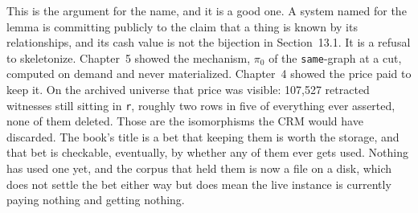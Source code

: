 This is the argument for the name, and it is a good one. A system named for the lemma is committing publicly to the claim that a thing is known by its relationships, and its cash value is not the bijection in Section~13.1. It is a refusal to skeletonize. Chapter~5 showed the mechanism, $\pi_0$ of the \texttt{same}-graph at a cut, computed on demand and never materialized. Chapter~4 showed the price paid to keep it. On the archived universe that price was visible: 107,527 retracted witnesses still sitting in \texttt{r}, roughly two rows in five of everything ever asserted, none of them deleted. Those are the isomorphisms the CRM would have discarded. The book's title is a bet that keeping them is worth the storage, and that bet is checkable, eventually, by whether any of them ever gets used. Nothing has used one yet, and the corpus that held them is now a file on a disk, which does not settle the bet either way but does mean the live instance is currently paying nothing and getting nothing.

